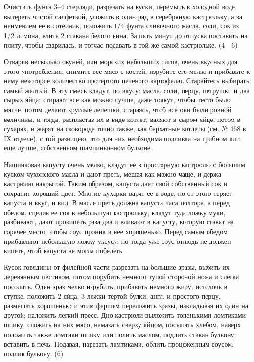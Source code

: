 
Очистить фунта 3--4 стерляди, разрезать на куски, перемыть в холодной воде, вытереть чистой салфеткой, уложить в один ряд в серебряную кастрюльку, а за неимением ее в сотейник, положить 1/4 фунта сливочного масла, соли, сок из 1/2 лимона, влить 2 стакана белого вина. За пять минут до отпуска поставить на плиту, чтобы сварилась, и тотчас подавать в той же самой кастрюльке. (4—6) 


Отварив несколько окуней, или морских небольших сигов, очень вкусных для этого употребления, снимите все мясо с костей, изрубите его мелко и прибавьте к нему некоторое количество протертого печеного картофелю. Старайтесь выбирать самый желтый. В эту смесь кладут, по вкусу: масла, соли, перцу, петрушки и два сырых яйца; стирают все как можно лучше, даже толкут, чтобы тесто было мягче, потом делают круглые лепешки, стараясь, чтоб все они были ровной величины, и тогда, распластав их в виде котлет, валяют в сыром яйце, потом в сухарях, и жарят на сковороде точно также, как бархатные котлеты (см. № 468 в IX отделе), с той разницею, что для них необходима подливка на грибном или, еще лучше, собственном шампиньонном бульоне. 


Нашинковав капусту очень мелко, кладут ее в просторную кастрюлю с большим куском чухонского масла и дают преть, мешая как можно чаще, и держа кастрюлю накрытой. Таким образом, капуста дает свой собственный сок и сохранит хороший цвет. Многие кухарки варят ее в воде, но от этого теряет капуста и вкус, и вид. В масле преть должна капуста часа полтора, а перед обедом, сцедив ее сок в небольшую кастрюльку, кладут туда ложку муки, разбивают, дают прокипеть раза два и вливают в капусту, которую ставят на горячее место, чтобы соус проник в нее хорошенько. Перед самым обедом прибавляют небольшую ложку уксусу; но тогда уже соус отнюдь не должен кипеть, чтоб капуста не могла побелеть. 


Кусок говядины от филейной части разрезать на большие зразы, выбить их деревянным пестиком, потом порубить немного тупой стороной ножа и слегка посолить. Один зраз мелко изрубить, прибавить немного жиру, истолочь в ступке, положить 2 яйца, 3 ложки тертой булки, англ. и простого перцу, размешать хорошенько и этим фаршем переложить зразы, накладывая их один на другой; наложить легкий пресс. Дно кастрюли выложить тоненькими ломтиками шпику, сложить на них мясо, намазать сверху яйцом, посыпать хлебом, наверх положить также ломтики шпику или полить маслом, подлить стакан бульону; вставить в печь. Подавая, нарезать ломтиками, облить процеженным соусом, подлив бульону. (6) 

